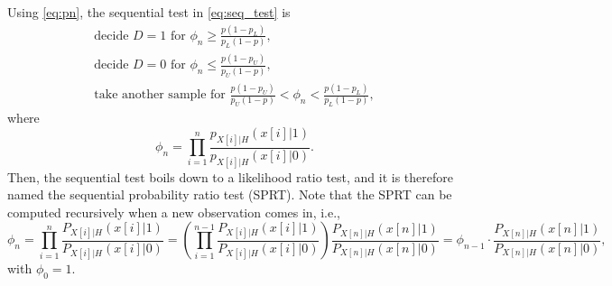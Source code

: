 Using \eqref{eq:pn}, the sequential test in \eqref{eq:seq_test} is
\begin{equation}
	\label{eq:seq_SPRT_mincost}
	\begin{array}{l}
		\text{decide } D = 1 \text{ for } \phi_n \geq \frac{p (1 - p_L)}{p_L(1 - p)}, \\
		\text{decide } D = 0 \text{ for } \phi_n \leq  \frac{p (1 - p_U)}{p_U (1 - p)}, \\
		\text{take another sample for } \frac{p (1 - p_U)}{p_U (1 - p)} < \phi_n < \frac{p (1 - p_L)}{p_L(1 - p)},
	\end{array}
\end{equation}
where
\begin{equation*}
	\phi_n = \prod_{i = 1}^{n} \frac{p_{X[i] | H}(x[i] | 1)}{p_{X[i] | H}(x[i] | 0)}.
\end{equation*}
Then, the sequential test boils down to a likelihood ratio test, and it is therefore named the sequential probability ratio test (SPRT). Note that the SPRT can be computed recursively when a new observation comes in, i.e.,
\begin{equation*}
	\phi_n = \prod_{i = 1}^{n} \frac{P_{X[i] | H}(x[i] | 1)}{P_{X[i] | H}(x[i] | 0)} = \left(\prod_{i = 1}^{n-1} \frac{P_{X[i] | H}(x[i] | 1)}{P_{X[i] | H}(x[i] | 0)}\right) \frac{P_{X[n] | H}(x[n] | 1)}{P_{X[n] | H}(x[n] | 0)} = \phi_{n-1} \cdot \frac{P_{X[n] | H}(x[n] | 1)}{P_{X[n] | H}(x[n] | 0)},
\end{equation*}
with $\phi_0 = 1$.


